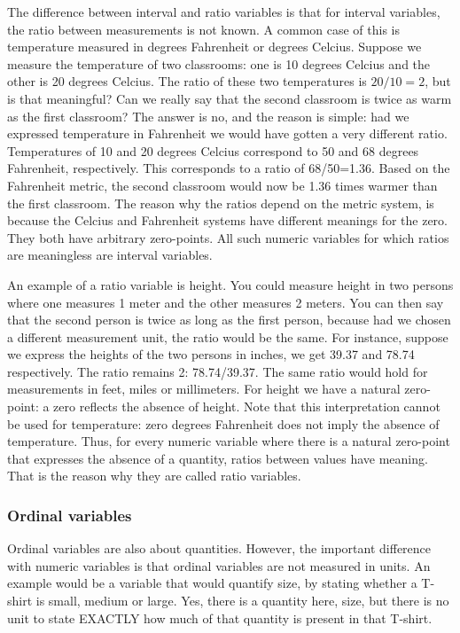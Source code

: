 The difference between interval and ratio variables is that for interval variables, the ratio between measurements is not known. A common case of this is temperature measured in degrees Fahrenheit or degrees Celcius. Suppose we measure the temperature of two classrooms: one is 10 degrees Celcius and the other is 20 degrees Celcius. The ratio of these two temperatures is $20/10=2$, but is that meaningful? Can we really say that the second classroom is twice as warm as the first classroom? The answer is no, and the reason is simple: had we expressed temperature in Fahrenheit we would have gotten a very different ratio. Temperatures of 10 and 20 degrees Celcius correspond to 50 and 68 degrees Fahrenheit, respectively. This corresponds to a ratio of 68/50=1.36. Based on the Fahrenheit metric, the second classroom would now be 1.36 times warmer than the first classroom. The reason why the ratios depend on the metric system, is because the Celcius and Fahrenheit systems have different meanings for the zero. They both have arbitrary zero-points. All such numeric variables for which ratios are meaningless are interval variables.

An example of a ratio variable is height. You could measure height in two persons where one measures 1 meter and the other measures 2 meters. You can then say that the second person is twice as long as the first person, because had we chosen a different measurement unit, the ratio would be the same. For instance, suppose we express the heights of the two persons in inches, we get 39.37 and 78.74 respectively. The ratio remains 2: 78.74/39.37. The same ratio would hold for measurements in feet, miles or millimeters. For height we have a natural zero-point: a zero reflects the absence of height. Note that this interpretation cannot be used for temperature: zero degrees Fahrenheit does not imply the absence of temperature. Thus, for every numeric variable where there is a natural zero-point that expresses the absence of a quantity, ratios between values have meaning. That is the reason why they are called ratio variables.



\subsubsection{Ordinal variables}

Ordinal variables are also about quantities. However, the important difference with numeric variables is that ordinal variables are not measured in units. An example would be a variable that would quantify size, by stating whether a T-shirt is small, medium or large. Yes, there is a quantity here, size, but there is no unit to state EXACTLY how much of that quantity is present in that T-shirt.

